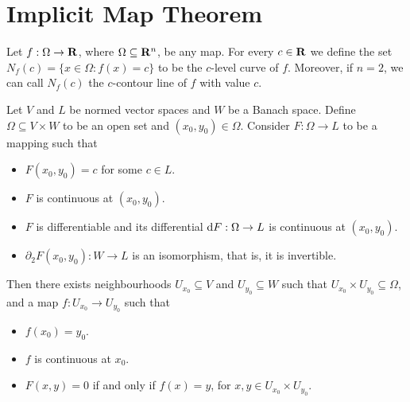 \section{Implicit Map Theorem}

\begin{definition}
    \label{def:level-curve}
    Let \(f: \Omega \to \mathbf{R}\), where \(\Omega \subseteq \mathbf{R}^n\), be any map. For every \(c \in \mathbf{R}\) we
    define the set \(N_f(c) = \{x \in \Omega \colon f(x) = c\}\) to be the \(c\)-level
    curve of \(f\). Moreover, if \(n = 2\), we can call \(N_f(c)\) the \(c\)-contour
    line of \(f\) with value \(c\).
\end{definition}

\begin{theorem}
    \label{thm:implicit-map}
    Let \(V\) and \(L\) be normed vector spaces and \(W\) be a Banach
    space. Define \(\Omega \subseteq V \times W\) to be an open set and \((x_0, y_0) \in \Omega\). Consider
    \(F: \Omega \to L\) to be a mapping such that
    \begin{itemize}\setlength\itemsep{0em}
        \item \(F(x_0, y_0) = c\) for some \(c \in L\).
        \item \(F\) is continuous at \((x_0, y_0)\).
        \item \(F\) is differentiable and its differential \(\mathrm{d} F: \Omega \to L\)
              is continuous at \((x_0, y_0)\).
        \item \(\partial_2F(x_0, y_0): W \to L\) is an isomorphism, that is, it is invertible.
    \end{itemize}
    Then there exists neighbourhoods \(U_{x_0} \subseteq V\) and \(U_{y_0} \subseteq W\) such that
    \(U_{x_0} \times U_{y_0} \subseteq \Omega\), and a map \(f: U_{x_0} \to U_{y_0}\) such that
    \begin{itemize}\setlength\itemsep{0em}
        \item \(f(x_0) = y_0\).
        \item \(f\) is continuous at \(x_0\).
        \item \(F(x, y) = 0\) if and only if \(f(x) = y\), for \(x, y \in U_{x_0} \times
              U_{y_0}\).
    \end{itemize}
\end{theorem}

